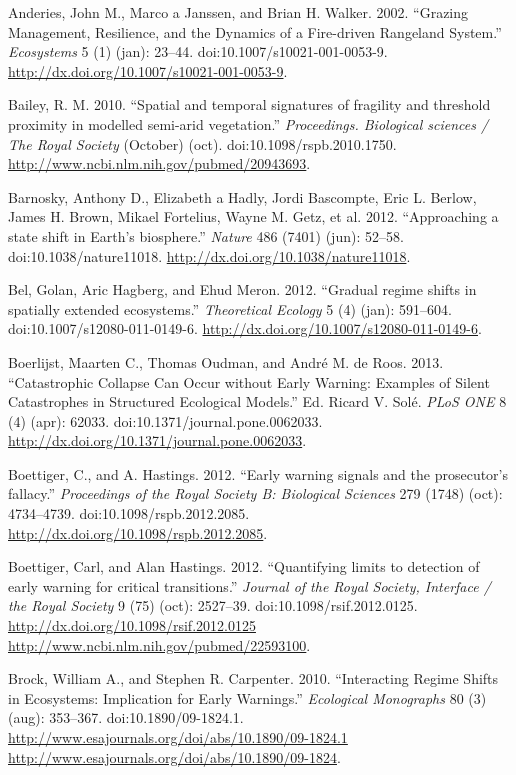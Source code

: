 \documentclass[author-year, review]{elsarticle} %
\begin{document}
Anderies, John M., Marco a Janssen, and Brian H. Walker. 2002. ``Grazing
Management, Resilience, and the Dynamics of a Fire-driven Rangeland
System.'' \emph{Ecosystems} 5 (1) (jan): 23--44.
doi:10.1007/s10021-001-0053-9.
\url{http://dx.doi.org/10.1007/s10021-001-0053-9}.

Bailey, R. M. 2010. ``Spatial and temporal signatures of fragility and
threshold proximity in modelled semi-arid vegetation.''
\emph{Proceedings. Biological sciences / The Royal Society} (October)
(oct). doi:10.1098/rspb.2010.1750.
\url{http://www.ncbi.nlm.nih.gov/pubmed/20943693}.

Barnosky, Anthony D., Elizabeth a Hadly, Jordi Bascompte, Eric L.
Berlow, James H. Brown, Mikael Fortelius, Wayne M. Getz, et al. 2012.
``Approaching a state shift in Earth's biosphere.'' \emph{Nature} 486
(7401) (jun): 52--58. doi:10.1038/nature11018.
\url{http://dx.doi.org/10.1038/nature11018}.

Bel, Golan, Aric Hagberg, and Ehud Meron. 2012. ``Gradual regime shifts
in spatially extended ecosystems.'' \emph{Theoretical Ecology} 5 (4)
(jan): 591--604. doi:10.1007/s12080-011-0149-6.
\url{http://dx.doi.org/10.1007/s12080-011-0149-6}.

Boerlijst, Maarten C., Thomas Oudman, and André M. de Roos. 2013.
``Catastrophic Collapse Can Occur without Early Warning: Examples of
Silent Catastrophes in Structured Ecological Models.'' Ed. Ricard V.
Solé. \emph{PLoS ONE} 8 (4) (apr): 62033.
doi:10.1371/journal.pone.0062033.
\url{http://dx.doi.org/10.1371/journal.pone.0062033}.

Boettiger, C., and A. Hastings. 2012. ``Early warning signals and the
prosecutor's fallacy.'' \emph{Proceedings of the Royal Society B:
Biological Sciences} 279 (1748) (oct): 4734--4739.
doi:10.1098/rspb.2012.2085.
\url{http://dx.doi.org/10.1098/rspb.2012.2085}.

Boettiger, Carl, and Alan Hastings. 2012. ``Quantifying limits to
detection of early warning for critical transitions.'' \emph{Journal of
the Royal Society, Interface / the Royal Society} 9 (75) (oct):
2527--39. doi:10.1098/rsif.2012.0125.
\href{http://dx.doi.org/10.1098/rsif.2012.0125 http://www.ncbi.nlm.nih.gov/pubmed/22593100}{http://dx.doi.org/10.1098/rsif.2012.0125
http://www.ncbi.nlm.nih.gov/pubmed/22593100}.

Brock, William A., and Stephen R. Carpenter. 2010. ``Interacting Regime
Shifts in Ecosystems: Implication for Early Warnings.'' \emph{Ecological
Monographs} 80 (3) (aug): 353--367. doi:10.1890/09-1824.1.
\href{http://www.esajournals.org/doi/abs/10.1890/09-1824.1 http://www.esajournals.org/doi/abs/10.1890/09-1824}{http://www.esajournals.org/doi/abs/10.1890/09-1824.1
http://www.esajournals.org/doi/abs/10.1890/09-1824}.
\end{document}
